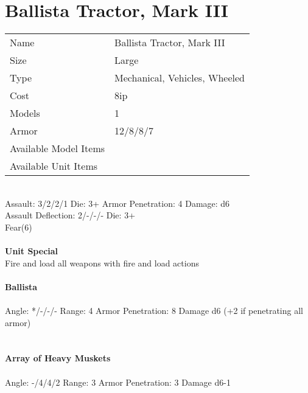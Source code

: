 






\pagebreak

\section{ Ballista Tractor, Mark III }

\begin{tabular}{ll}
  Name & Ballista Tractor, Mark III \\
  Size & Large\\
  Type & Mechanical, Vehicles, Wheeled\\
  Cost & 8ip\\
  Models & 1\\
  Armor & 12/8/8/7\\
  Available Model Items &  \\
  Available Unit Items &  \\
\end{tabular}

\ \\
Assault: 3/2/2/1 Die: 3+ Armor Penetration: 4 Damage: d6 \\
Assault Deflection: 2/-/-/- Die: 3+\\
\indent Fear(6) \\
\ \\

{\bf Unit Special} \\
Fire and load all weapons with fire and load actions
\ \\
\ \\
{\bf Ballista } \\
\ \\
Angle: */-/-/- Range: 4 Armor Penetration: 8 Damage d6 (+2 if penetrating all armor) \\
\indent  \\



\ \\
{\bf Array of Heavy Muskets } \\
\ \\
Angle: -/4/4/2 Range: 3 Armor Penetration: 3 Damage d6-1 \\
\indent  \\






